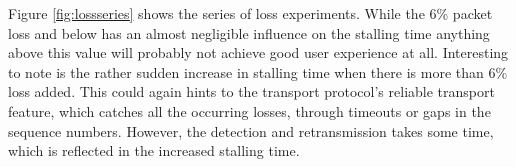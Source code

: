 Figure \ref{fig:lossseries} shows the series of loss experiments. While the 6\% packet loss and below has an almost negligible influence on the stalling time anything above this value will probably not achieve good user experience at all. Interesting to note is the rather sudden increase in stalling time when there is more than 6\% loss added. This could again hints to the transport protocol's reliable transport feature, which catches all the occurring losses, through timeouts or gaps in the sequence numbers. However, the detection and retransmission takes some time, which is reflected in the increased stalling time.






